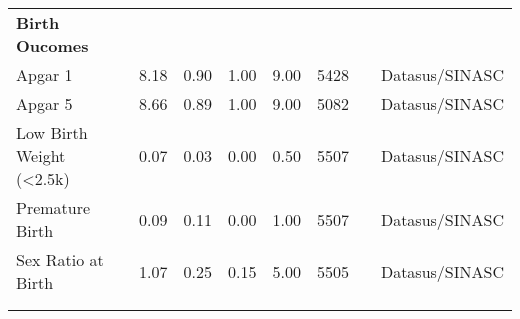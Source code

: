 \begin{table}[H]
\begin{footnotesize}
\begin{center}
{\begin{threeparttable}[b]
\begin{tabular}{rrrrrrrr}
    \multicolumn{1}{l}{\textbf{Birth Oucomes}} &       &       &       &       &       &       &  \\
    \multicolumn{1}{l}{Apgar 1} & \multicolumn{1}{c}{8.18} & \multicolumn{1}{c}{0.90} & \multicolumn{1}{c}{1.00} & \multicolumn{1}{c}{9.00} & \multicolumn{1}{c}{5428} &       & \multicolumn{1}{c}{Datasus/SINASC} \\
    \multicolumn{1}{l}{Apgar 5} & \multicolumn{1}{c}{8.66} & \multicolumn{1}{c}{0.89} & \multicolumn{1}{c}{1.00} & \multicolumn{1}{c}{9.00} & \multicolumn{1}{c}{5082} &       & \multicolumn{1}{c}{Datasus/SINASC} \\
    \multicolumn{1}{l}{Low Birth Weight (<2.5k)} & \multicolumn{1}{c}{0.07} & \multicolumn{1}{c}{0.03} & \multicolumn{1}{c}{0.00} & \multicolumn{1}{c}{0.50} & \multicolumn{1}{c}{5507} &       & \multicolumn{1}{c}{Datasus/SINASC} \\
    \multicolumn{1}{l}{Premature Birth} & \multicolumn{1}{c}{0.09} & \multicolumn{1}{c}{0.11} & \multicolumn{1}{c}{0.00} & \multicolumn{1}{c}{1.00} & \multicolumn{1}{c}{5507} &       & \multicolumn{1}{c}{Datasus/SINASC} \\
    \multicolumn{1}{l}{Sex Ratio at Birth} & \multicolumn{1}{c}{1.07} & \multicolumn{1}{c}{0.25} & \multicolumn{1}{c}{0.15} & \multicolumn{1}{c}{5.00} & \multicolumn{1}{c}{5505} &       & \multicolumn{1}{c}{Datasus/SINASC} \\
          &       &       &       &       &       &       &  \\
    \midrule
    \midrule
          &       &       &       &       &       &       &  \\
    \end{tabular}%
    



\end{threeparttable}
}
\end{center}
\end{footnotesize}
\end{table}
